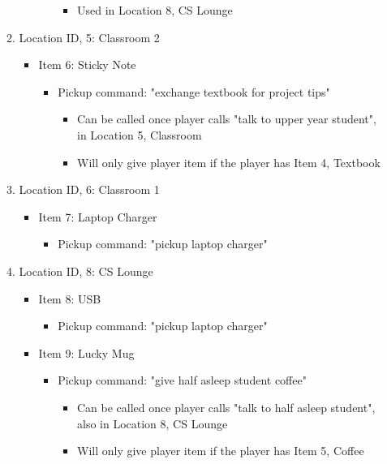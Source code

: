 \documentclass[11pt]{article}
\begin{document}
\begin{enumerate}
\begin{enumerate}
\begin{itemize}
\begin{itemize}
\begin{itemize}
                \item Used in Location 8, CS Lounge
            \end{itemize}
        \end{itemize}
    \end{itemize}
    \item Location ID, 5: Classroom 2
    \begin{itemize}
        \item Item 6: Sticky Note
        \begin{itemize}
            \item Pickup command: "exchange textbook for project tips"
            \begin{itemize}
                \item Can be called once player calls "talk to upper year student", in Location 5, Classroom
                \item Will only give player item if the player has Item 4, Textbook
            \end{itemize}
        \end{itemize}
    \end{itemize}
    \item Location ID, 6: Classroom 1
    \begin{itemize}
        \item Item 7: Laptop Charger
        \begin{itemize}
            \item Pickup command: "pickup laptop charger"
        \end{itemize}
    \end{itemize}
    \item Location ID, 8: CS Lounge
    \begin{itemize}
        \item Item 8: USB
        \begin{itemize}
            \item Pickup command: "pickup laptop charger"
        \end{itemize}
        \item Item 9: Lucky Mug
        \begin{itemize}
            \item Pickup command: "give half asleep student coffee"
            \begin{itemize}
                \item Can be called once player calls "talk to half asleep student", also in Location 8, CS Lounge
                \item Will only give player item if the player has Item 5, Coffee

\end{itemize}
\end{itemize}
\end{itemize}
\end{enumerate}
\end{enumerate}
\end{document}
